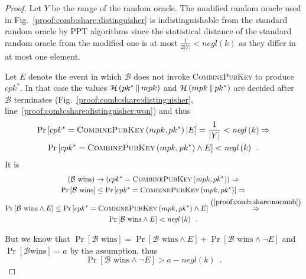 \begin{proof}
      Let $Y$ be the range of the random oracle. The modified random oracle used
      in Fig.~\ref{proof:comb:share:distinguisher} is indistinguishable from the
      standard random oracle by PPT algorithms since the statistical distance of
      the standard random oracle from the modified one is at most
      $\frac{1}{2|Y|} < \mathit{negl}\left(k\right)$ as they differ in at most
      one element.

      Let $E$ denote the event in which $\mathcal{B}$ does not invoke
      \textsc{CombinePubKey} to produce $cpk^*$. In that case the values
      $\mathcal{H}\left(pk^* \,\|\, mpk\right)$ and $\mathcal{H}\left(mpk
      \,\|\, pk^*\right)$ are decided after $\mathcal{B}$ terminates
      (Fig.~\ref{proof:comb:share:distinguisher},
      line~\ref{proof:comb:share:distinguisher:won}) and thus
      \begin{equation}
        \begin{gathered}
          \Pr\left[cpk^* = \textsc{CombinePubKey}\left(mpk, pk^*\right) |
          E\right] = \frac{1}{|Y|} < \mathit{negl}\left(k\right) \Rightarrow \\
          \Pr\left[cpk^* = \textsc{CombinePubKey}\left(mpk, pk^*\right)
          \wedge E\right] < \mathit{negl}\left(k\right) \enspace.
        \end{gathered}
        \label{proof:comb:share:nocomb}
      \end{equation}
      It is
      \begin{gather*}
        \left(\mathcal{B} \text{ wins}\right) \rightarrow \left(cpk^* =
        \textsc{CombinePubKey}\left(mpk, pk^*\right)\right) \Rightarrow \\
        \Pr\left[\mathcal{B} \text{ wins}\right] \leq \Pr\left[cpk^* =
        \textsc{CombinePubKey}\left(mpk, pk^*\right)\right] \Rightarrow \\
        \Pr\left[\mathcal{B} \text{ wins} \wedge E\right] \leq \Pr\left[cpk^* =
        \textsc{CombinePubKey}\left(mpk, pk^*\right) \wedge E\right]
        \overset{\left(\ref{proof:comb:share:nocomb}\right)}{\Rightarrow} \\
        \Pr\left[\mathcal{B} \text{ wins} \wedge E\right] <
        \mathit{negl}\left(k\right) \enspace.
      \end{gather*}

      But we know that $\Pr\left[\mathcal{B} \text{ wins}\right] =
      \Pr\left[\mathcal{B} \text{ wins} \wedge E\right] + \Pr\left[\mathcal{B}
      \text{ wins} \wedge \neg E\right]$ and $\Pr\left[\mathcal{B} \text{
      wins}\right] = a$ by the assumption, thus
      \begin{equation}
        \label{proof:comb:share:nohash}
        \Pr\left[\mathcal{B} \text{ wins} \wedge \neg E\right] > a -
        \mathit{negl}\left(k\right) \enspace.
      \end{equation}


\end{proof}
